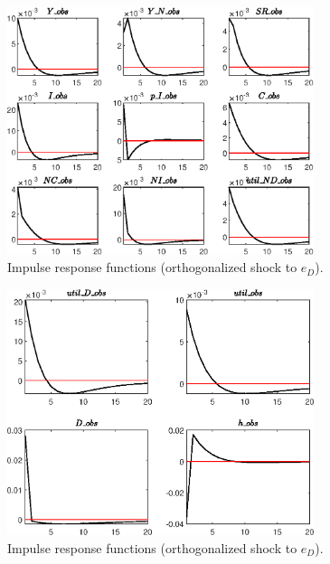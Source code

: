 \begin{figure}[H]
\centering 
\includegraphics[width=0.80\textwidth]{BRS_sectoral/graphs/BRS_sectoral_IRF_e_D1}
\caption{Impulse response functions (orthogonalized shock to ${e_D}$).}\label{Fig:IRF:e_D:1}
\end{figure}
 
\begin{figure}[H]
\centering 
\includegraphics[width=0.80\textwidth]{BRS_sectoral/graphs/BRS_sectoral_IRF_e_D2}
\caption{Impulse response functions (orthogonalized shock to ${e_D}$).}\label{Fig:IRF:e_D:2}
\end{figure}
 
